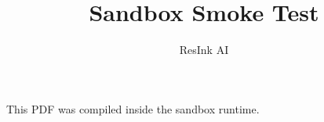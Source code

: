 \documentclass{article}
\title{Sandbox Smoke Test}
\author{ResInk AI}
\date{}
\begin{document}
\maketitle

This PDF was compiled inside the sandbox runtime.
\end{document}
